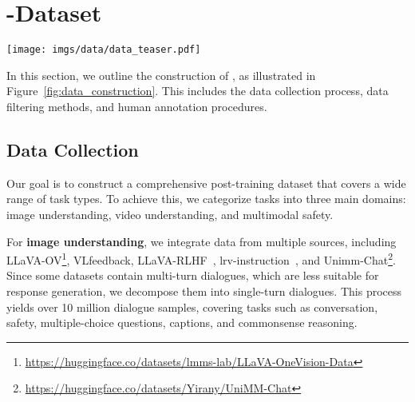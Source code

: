 \section{\abbr-Dataset}

\begin{figure*}
    \centering
    \texttt{[image: imgs/data/data\_teaser.pdf]}
    \caption{\textbf{\abbr Construction Pipeline}. \textit{(1) Data Collection and Cleaning}: Starting with 10 million instruction samples, we cluster data based on image similarity, and uniformly sample across diverse categories. This results in a diverse dataset covering image-based Q\&A (e.g., multiple-choice, dialogues, and safety-related questions) and video Q\&A formats. \textit{(2) Response Generation}: We leverage state-of-the-art models, including GPT-4o and Qwen2-VL-72B, to generate high-quality responses. \textit{(3) Human Annotation}: We conduct manual annotation across nine categories, including scoring, ranking, and explanations, ensuring fine-grained evaluation.}
    \label{fig:data_construction}
\end{figure*}

In this section, we outline the construction of \abbr, as illustrated in Figure~\ref{fig:data_construction}. This includes the data collection process, data filtering methods, and human annotation procedures.

\subsection{Data Collection}

Our goal is to construct a comprehensive post-training dataset that covers a wide range of task types. To achieve this, we categorize tasks into three main domains: image understanding, video understanding, and multimodal safety.

For \textbf{image understanding}, we integrate data from multiple sources, including LLaVA-OV\footnote{\url{https://huggingface.co/datasets/lmms-lab/LLaVA-OneVision-Data}}, VLfeedback\cite{li2023silkie}, LLaVA-RLHF~\cite{sun2023aligning}, lrv-instruction~\cite{liu2023mitigating}, and Unimm-Chat\footnote{\url{https://huggingface.co/datasets/Yirany/UniMM-Chat}}. Since some datasets contain multi-turn dialogues, which are less suitable for response generation, we decompose them into single-turn dialogues. This process yields over 10 million dialogue samples, covering tasks such as conversation, safety, multiple-choice questions, captions, and commonsense reasoning.

